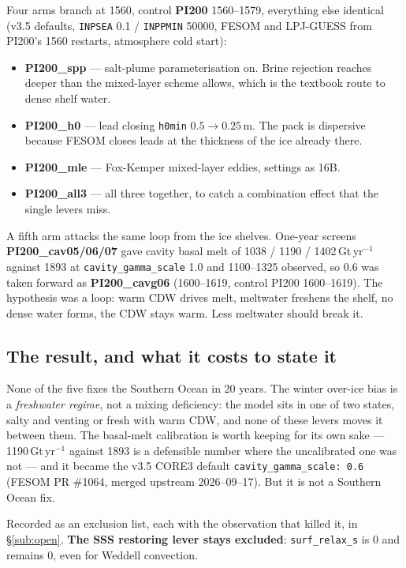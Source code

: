\documentclass[10pt]{article}
\begin{document}
Four arms branch at 1560, control \textbf{PI200} 1560--1579, everything else identical (v3.5
defaults, \texttt{INPSEA} 0.1 / \texttt{INPPMIN} 50000, FESOM and LPJ-GUESS from PI200's 1560
restarts, atmosphere cold start):

\begin{itemize}
  \item \textbf{PI200\_spp} --- salt-plume parameterisation on. Brine rejection reaches deeper
        than the mixed-layer scheme allows, which is the textbook route to dense shelf water.
  \item \textbf{PI200\_h0} --- lead closing \texttt{h0min} $0.5\to0.25$\,m. The pack is
        dispersive because FESOM closes leads at the thickness of the ice already there.
  \item \textbf{PI200\_mle} --- Fox-Kemper mixed-layer eddies, settings as 16B.
  \item \textbf{PI200\_all3} --- all three together, to catch a combination effect that the
        single levers miss.
\end{itemize}

A fifth arm attacks the same loop from the ice shelves. One-year screens
\textbf{PI200\_cav05/06/07} gave cavity basal melt of 1038 / 1190 / 1402\,Gt\,yr$^{-1}$ against
1893 at \texttt{cavity\_gamma\_scale} 1.0 and 1100--1325 observed, so 0.6 was taken forward as
\textbf{PI200\_cavg06} (1600--1619, control PI200 1600--1619). The hypothesis was a loop: warm
CDW drives melt, meltwater freshens the shelf, no dense water forms, the CDW stays warm. Less
meltwater should break it.

\subsection{The result, and what it costs to state it}\label{sub:r37null}

None of the five fixes the Southern Ocean in 20 years. The winter over-ice bias is a
\emph{freshwater regime}, not a mixing deficiency: the model sits in one of two states, salty
and venting or fresh with warm CDW, and none of these levers moves it between them. The
basal-melt calibration is worth keeping for its own sake --- 1190\,Gt\,yr$^{-1}$ against 1893 is
a defensible number where the uncalibrated one was not --- and it became the v3.5 CORE3 default
\texttt{cavity\_gamma\_scale: 0.6} (FESOM PR \#1064, merged upstream 2026--09--17). But it is
not a Southern Ocean fix.

Recorded as an exclusion list, each with the observation that killed it, in
\S\ref{sub:open}. \textbf{The SSS restoring lever stays excluded}: \texttt{surf\_relax\_s} is 0
and remains 0, even for Weddell convection.
\end{document}
